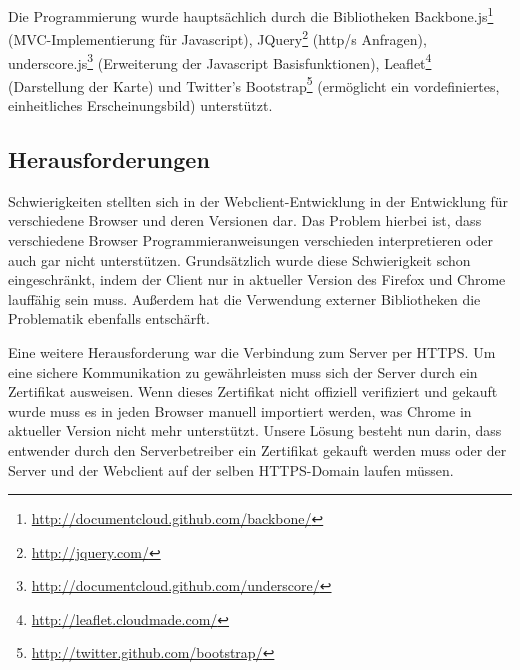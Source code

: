 Die Programmierung wurde hauptsächlich durch die Bibliotheken 
Backbone.js\footnote{\url{http://documentcloud.github.com/backbone/}} (MVC-Implementierung für Javascript), 
JQuery\footnote{\url{http://jquery.com/}} (http/s Anfragen), 
underscore.js\footnote{\url{http://documentcloud.github.com/underscore/}} (Erweiterung der Javascript Basisfunktionen),
Leaflet\footnote{\url{http://leaflet.cloudmade.com/}} (Darstellung der Karte) und 
Twitter's Bootstrap\footnote{\url{http://twitter.github.com/bootstrap/}} (ermöglicht ein vordefiniertes, einheitliches Erscheinungsbild) unterstützt.

\subsection*{Herausforderungen}

Schwierigkeiten stellten sich in der Webclient-Entwicklung in der Entwicklung für verschiedene Browser und deren Versionen dar.
Das Problem hierbei ist, dass verschiedene Browser Programmieranweisungen verschieden interpretieren oder auch gar nicht unterstützen. 
Grundsätzlich wurde diese Schwierigkeit schon eingeschränkt, indem der Client nur in aktueller Version des Firefox und Chrome lauffähig sein muss. Außerdem hat die Verwendung externer Bibliotheken die Problematik ebenfalls entschärft.

Eine weitere Herausforderung war die Verbindung zum Server per HTTPS.
Um eine sichere Kommunikation zu gewährleisten muss sich der Server durch ein Zertifikat ausweisen.
Wenn dieses Zertifikat nicht offiziell verifiziert und gekauft wurde muss es in jeden Browser manuell importiert werden, was Chrome in aktueller Version nicht mehr unterstützt.
Unsere Lösung besteht nun darin, dass entwender durch den Serverbetreiber ein Zertifikat gekauft werden muss oder der Server und der Webclient auf der selben HTTPS-Domain laufen müssen.
